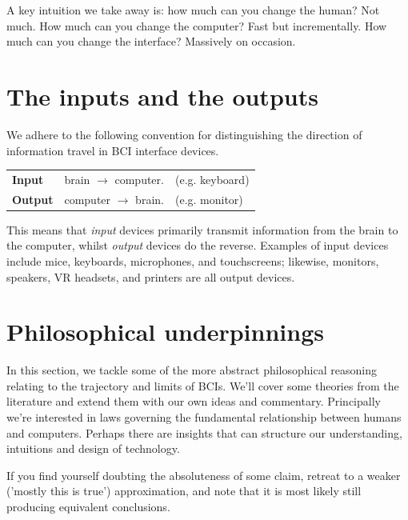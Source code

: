 \documentclass[logo,bsc,singlespacing,parskip]{infthesis}
\begin{document}
A key intuition we take away is: how much can you change the human? Not much. How much can you change the computer? Fast but incrementally. How much can you change the interface? Massively on occasion.

\section{The inputs and the outputs}
\label{sec:org2df8f03}
We adhere to the following convention for distinguishing the direction of information travel in BCI interface devices.
\medskip

\begin{tabular}{lll}
\textbf{Input} \label{input} & brain \(\rightarrow\) computer. & (e.g. keyboard)\\
\textbf{Output} \label{output} & computer \(\rightarrow\) brain. & (e.g. monitor)\\
\end{tabular}

\medskip
\noindent This means that \emph{input} devices primarily transmit information from the brain to the computer, whilst \emph{output} devices do the reverse.
Examples of input devices include mice, keyboards, microphones, and touchscreens; likewise, monitors, speakers, VR headsets, and printers are all output devices.

\section{Philosophical underpinnings}
\label{sec:org86b40c5}
In this section, we tackle some of the more abstract philosophical reasoning relating to the trajectory and limits of BCIs.
We'll cover some theories from the literature and extend them with our own ideas and commentary.
Principally we're interested in laws governing the fundamental relationship between humans and computers.
Perhaps there are insights that can structure our understanding, intuitions and design of technology.

If you find yourself doubting the absoluteness of some claim, retreat to a weaker ('mostly this is true') approximation, and note that it is most likely still producing equivalent conclusions.
\end{document}
